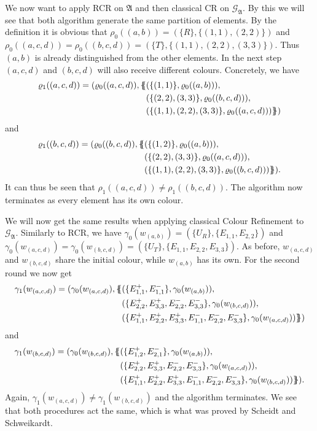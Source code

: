 We now want to apply RCR on $\mathfrak A$ and then classical CR on $\mathcal{G}_{\mathfrak A}$.
By this we will see that both algorithm generate the same partition of elements.
By the definition it is obvious that $\rho_0((a,b))=(\{R\},\{(1,1),(2,2)\})$ and $\rho_0((a,c,d))=\rho_0((b,c,d))=(\{T\}, \{(1,1),(2,2),(3,3)\})$.
Thus $(a,b)$ is already distinguished from the other elements.
In the next step $(a,c,d)$ and $(b,c,d)$ will also receive different colours.
Concretely, we have
\begin{align*}
	\varrho_1((a,c,d))=(\varrho_0((a,c,d)), \{\kern-.35em\{
		&(\{(1,1)\}, \varrho_0((a,b))), \\
		&(\{(2,2),(3,3)\}, \varrho_0((b,c,d))), \\
		&(\{(1,1),(2,2),(3,3)\}, \varrho_0((a,c,d)))
	\}\kern-.35em\})
\end{align*}
and
\begin{align*}
	\varrho_1((b,c,d))=(\varrho_0((b,c,d)), \{\kern-.35em\{ 
		&(\{(1,2)\}, \varrho_0((a,b))), \\
		&(\{(2,2),(3,3)\}, \varrho_0((a,c,d))), \\
		&(\{(1,1),(2,2),(3,3)\}, \varrho_0((b,c,d)))
	\}\kern-.35em\}).
\end{align*}
It can thus be seen that $\rho_1((a,c,d))\neq \rho_1((b,c,d))$.
The algorithm now terminates as every element has its own colour.

We will now get the same results when applying classical Colour Refinement to $\mathcal{G}_{\mathfrak A}$.
Similarly to RCR, we have $\gamma_0(w_{(a,b)})=(\{U_R\}, \{E_{1,1},E_{2,2}\})$ and $\gamma_0(w_{(a,c,d)})=\gamma_0(w_{(b,c,d)})=(\{U_T\}, \{E_{1,1},E_{2,2},E_{3,3}\})$.
As before, $w_{(a,c,d)}$ and $w_{(b,c,d)}$ share the initial colour, while $w_{(a,b)}$ has its own.
For the second round we now get 
\begin{align*}
	\gamma_1(w_{(a,c,d)})=(\gamma_0(w_{(a,c,d)}), \{\kern-.35em\{
		&(\{E_{1,1}^+,E_{1,1}^-\}, \gamma_0(w_{(a,b)})), \\
		&(\{E_{2,2}^+,E_{3,3}^+, E_{2,2}^-, E_{3,3}^-\}, \gamma_0(w_{(b,c,d)})), \\
		&(\{E_{1,1}^+,E_{2,2}^+,E_{3,3}^+,E_{1,1}^-,E_{2,2}^-,E_{3,3}^-\}, \gamma_0(w_{(a,c,d)}))
	\}\kern-.35em\})
\end{align*}
and
\begin{align*}
	\gamma_1(w_{(b,c,d)})=(\gamma_0(w_{(b,c,d)}), \{\kern-.35em\{
	&(\{E_{1,2}^+,E_{2,1}^-\}, \gamma_0(w_{(a,b)})), \\
	&(\{E_{2,2}^+,E_{3,3}^+, E_{2,2}^-, E_{3,3}^-\}, \gamma_0(w_{(a,c,d)})), \\
	&(\{E_{1,1}^+,E_{2,2}^+,E_{3,3}^+,E_{1,1}^-,E_{2,2}^-,E_{3,3}^-\}, \gamma_0(w_{(b,c,d)}))
	\}\kern-.35em\}).
\end{align*}
Again, $\gamma_1(w_{(a,c,d)})\neq \gamma_1(w_{(b,c,d)})$ and the algorithm terminates.
We see that both procedures act the same, which is what was proved by Scheidt and Schweikardt.

